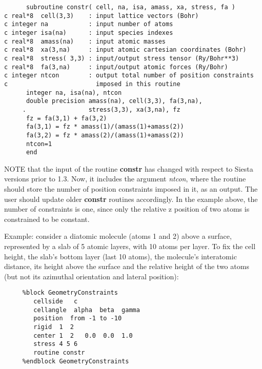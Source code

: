 \documentclass[11pt]{article}
\begin{document}
\begin{description}
\begin{itemize}
\begin{verbatim}
      subroutine constr( cell, na, isa, amass, xa, stress, fa )
c real*8  cell(3,3)    : input lattice vectors (Bohr)
c integer na           : input number of atoms
c integer isa(na)      : input species indexes
c real*8  amass(na)    : input atomic masses
c real*8  xa(3,na)     : input atomic cartesian coordinates (Bohr)
c real*8  stress( 3,3) : input/output stress tensor (Ry/Bohr**3)
c real*8  fa(3,na)     : input/output atomic forces (Ry/Bohr)
c integer ntcon        : output total number of position constraints
c                        imposed in this routine
      integer na, isa(na), ntcon
      double precision amass(na), cell(3,3), fa(3,na),
     .                 stress(3,3), xa(3,na), fz
      fz = fa(3,1) + fa(3,2) 
      fa(3,1) = fz * amass(1)/(amass(1)+amass(2))
      fa(3,2) = fz * amass(2)/(amass(1)+amass(2))
      ntcon=1
      end
\end{verbatim}

NOTE that the input of the routine {\bf constr} has changed
with respect to {\sc Siesta} versions prior to 1.3. Now, it includes the
argument {\it ntcon}, where the routine should
store the number of position constraints imposed in it,
as an output.  The user should update older {\bf constr} routines
accordingly. In the example above, the number of constraints is one,
since only the relative z position of two atoms is constrained
to be constant.

\end{itemize}

Example: consider a diatomic molecule (atoms 1 and 2) above a surface, 
represented by a slab of 5 atomic layers, with 10 atoms per layer.
To fix the cell height, the slab's bottom layer (last 10 atoms),
the molecule's interatomic distance, its height above the surface and
the relative height of the two atoms
(but not its azimuthal orientation and lateral position):

\begin{verbatim}
     %block GeometryConstraints
        cellside   c 
        cellangle  alpha  beta  gamma
        position  from -1 to -10
        rigid  1  2
        center 1  2   0.0  0.0  1.0
        stress 4 5 6
        routine constr
     %endblock GeometryConstraints
\end{verbatim}


\end{description}
\end{document}
